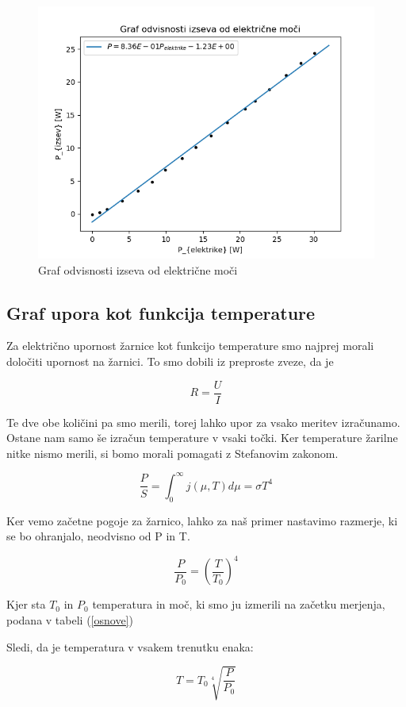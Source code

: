 \documentclass[11pt, a4paper]{article}
\theoremstyle{definition}
\theoremstyle{example}
\theoremstyle{izrek}
\begin{document}
\begin{figure}[H]
	\centering
    \includegraphics[width=12cm]{Izsev-elektrika.png}
    \caption{Graf odvisnosti izseva od električne moči}
\end{figure}

\pagebreak
\subsection{Graf upora kot funkcija temperature}
Za električno upornost žarnice kot funkcijo temperature smo najprej morali določiti upornost na žarnici. To smo dobili iz preproste zveze, da je

$$R=\frac{U}{I}$$

Te dve obe količini pa smo merili, torej lahko upor za vsako meritev izračunamo.\\
 
Ostane nam samo še izračun temperature v vsaki točki. Ker temperature žarilne nitke nismo merili, si bomo morali pomagati z Stefanovim zakonom. 
 
$$\frac{P}{S}=\int_{0}^{\infty}j(\mu, T)d\mu=\sigma T^4$$

Ker vemo začetne pogoje za žarnico, lahko za naš primer nastavimo razmerje, ki se bo ohranjalo, neodvisno od P in T. 

$$\frac{P}{P_0}=\left(\frac{T}{T_0}\right)^4$$

Kjer sta $T_0$ in $P_0$ temperatura in moč, ki smo ju izmerili na začetku merjenja, podana v tabeli (\ref{osnove})

Sledi, da je temperatura v vsakem trenutku enaka: 

$$T=T_0\sqrt[4]{\frac{P}{P_0}}$$
\end{document}
